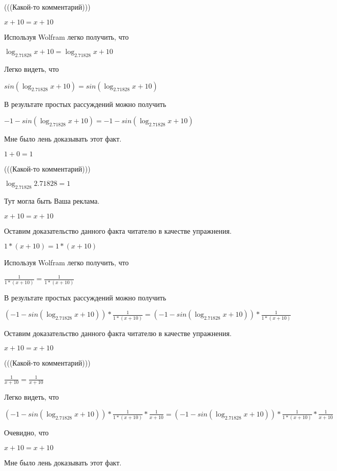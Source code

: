 \documentclass[12pt,a4paper,fleqn]{article}
\theoremstyle{definition}
\begin{document}
(((Какой-то комментарий)))

$ x  +  10  =  x  +  10 $

Используя Wolfram легко получить, что

$\log_{ 2.71828 }{ x  +  10 } = \log_{ 2.71828 }{ x  +  10 }$

Легко видеть, что

$sin(\log_{ 2.71828 }{ x  +  10 }) = sin(\log_{ 2.71828 }{ x  +  10 })$

В результате простых рассуждений можно получить

$ -1  - sin(\log_{ 2.71828 }{ x  +  10 }) =  -1  - sin(\log_{ 2.71828 }{ x  +  10 })$

Мне было лень доказывать этот факт.

$ 1  +  0  =  1 $

(((Какой-то комментарий)))

$\log_{ 2.71828 }{ 2.71828 } =  1 $

Тут могла быть Ваша реклама.

$ x  +  10  =  x  +  10 $

Оставим доказательство данного факта читателю в качестве упражнения.

$ 1  * ( x  +  10 ) =  1  * ( x  +  10 )$

Используя Wolfram легко получить, что

$\frac{ 1 }{ 1  * ( x  +  10 )}
 = \frac{ 1 }{ 1  * ( x  +  10 )}
$

В результате простых рассуждений можно получить

$( -1  - sin(\log_{ 2.71828 }{ x  +  10 })) * \frac{ 1 }{ 1  * ( x  +  10 )}
 = ( -1  - sin(\log_{ 2.71828 }{ x  +  10 })) * \frac{ 1 }{ 1  * ( x  +  10 )}
$

Оставим доказательство данного факта читателю в качестве упражнения.

$ x  +  10  =  x  +  10 $

(((Какой-то комментарий)))

$\frac{ 1 }{ x  +  10 }
 = \frac{ 1 }{ x  +  10 }
$

Легко видеть, что

$( -1  - sin(\log_{ 2.71828 }{ x  +  10 })) * \frac{ 1 }{ 1  * ( x  +  10 )}
 * \frac{ 1 }{ x  +  10 }
 = ( -1  - sin(\log_{ 2.71828 }{ x  +  10 })) * \frac{ 1 }{ 1  * ( x  +  10 )}
 * \frac{ 1 }{ x  +  10 }
$

Очевидно, что

$ x  +  10  =  x  +  10 $

Мне было лень доказывать этот факт.
\end{document}
